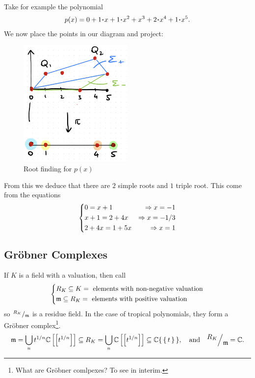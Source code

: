 \documentclass[12pt]{memoir}
\theoremstyle{definition}
\begin{document}
\begin{Ex}
    Take for example the polynomial 
    $$p(x)=0+1\.x+1\.x^2+x^3+2\.x^4+1\.x^5.$$
    We now place the points in our diagram and project:
    \begin{figure}[h!]
        \centering
        \includegraphics[width=0.5\textwidth]{figs/fig6-2CombinatorializationExample.png}
        \caption{Root finding for $p(x)$}
        \label{fig:6.2-CombinatorializationExample}
    \end{figure}
    From this we deduce that there are $2$ simple roots and $1$ triple root. This come from the equations
    $$
    \left\lbrace
    \begin{aligned}
        &0=x+1&\Rightarrow x=-1\\
        &x+1=2+4x&\Rightarrow x=-1/3\\
        &2+4x=1+5x&\Rightarrow x=1
    \end{aligned}
    \right.
    $$
\end{Ex}

\subsection{Gr\"obner Complexes}

If $K$ is a field with a valuation, then call
$$
\left\lbrace
\begin{aligned}
    &R_K\subseteq K=\text{ elements with non-negative valuation}\\
    &\mathfrak{m}\subseteq R_K=\text{ elements with positive valuation}
\end{aligned}
\right.
$$
so $\quot{R_K}{\lie{m}}$ is a residue field. In the case of tropical polynomials, they form a Gr\"obner complex\footnote{What are Gr\"obner comlpexes? To see in interim.}.
$$\lie{m}=\bigcup_nt^{1/n}\bC\bonj{\bonj{t^{1/n}}}\subseteq R_K=\bigcup_n\bC\bonj{\bonj{t^{1/n}}}\subseteq\bC\set{\set{t}},\word{and}\quot{R_K}{\lie{m}}=\bC.$$
\end{document}
